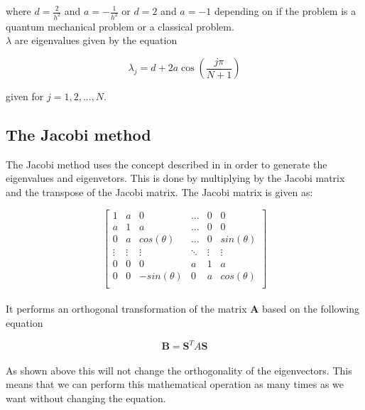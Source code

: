 \documentclass{article}
\begin{document}
where $d = \frac{2}{h^2}$ and $a = - \frac{1}{h^2}$ or $d = 2$ and $a = - 1$ depending on if the problem is a quantum mechanical problem or a classical problem.  \\

$\lambda$ are eigenvalues given by the equation

\begin{equation}  \label{eq:eigenvalues}
    \lambda_j = d + 2a \cos \left( \frac{j \pi }{N + 1} \right)
\end{equation}

given for $ j = 1, 2, ..., N$. \\

\subsection{The Jacobi method}

The Jacobi method uses the concept described in  in order to generate the eigenvalues and eigenvetors. This is done by multiplying by the Jacobi matrix and the transpose of the Jacobi matrix. The Jacobi matrix is given as:

\begin{equation*} \label{eq:jacobimatrix}
    \begin{bmatrix}
        1 & a & 0 & \dots & 0 & 0 \\
        a & 1 & a & \dots & 0 & 0 \\
        0 & a & cos(\theta) & \dots & 0 & sin(\theta) \\
        \vdots & \vdots & \vdots & \ddots & \vdots & \vdots \\
        0 & 0 & 0 & a & 1 & a \\
        0 & 0 & -sin(\theta) & 0 & a & cos(\theta) \\
    \end{bmatrix}
\end{equation*} \\

It performs an orthogonal transformation of the matrix \textbf{A} based on the following equation

\begin{equation*}
    \textbf{B} = \textbf{S}^T A \textbf{S}
\end{equation*} \\

As shown above this will not change the orthogonality of the eigenvectors. This means that we can perform this mathematical operation as many times as we want without changing the equation. \\
\end{document}

